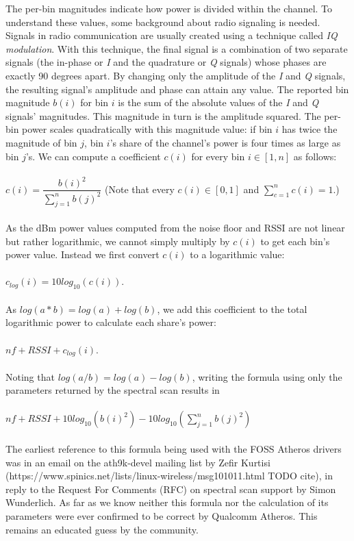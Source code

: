 \documentclass[a4paper, 11pt]{article}
\begin{document}
The per-bin magnitudes indicate how power is divided within the channel. To understand these values, some background about radio signaling is needed. Signals in radio communication are usually created using a technique called \textit{IQ modulation}. With this technique, the final signal is a combination of two separate signals (the in-phase or \textit{I} and the quadrature or \textit{Q} signals) whose phases are exactly 90 degrees apart. By changing only the amplitude of the \textit{I} and \textit{Q} signals, the resulting signal's amplitude and phase can attain any value. The reported bin magnitude $b(i)$ for bin $i$ is the sum of the absolute values of the \textit{I} and \textit{Q} signals' magnitudes. This magnitude in turn is the amplitude squared. The per-bin power scales quadratically with this magnitude value: if bin $i$ has twice the magnitude of bin $j$, bin $i$'s share of the channel's power is four times as large as bin $j$'s. We can compute a coefficient $c(i)$ for every bin $i \in [1,n]$ as follows:\\\\\hspace*{1.5em}$c(i) = \dfrac{b(i)^2}{\sum\limits_{j=1}^{n}b(j)^2}$ (Note that every $c(i) \in [0,1]$ and $\sum\limits_{c=1}^{n}{c(i)} = 1$.) \\\\
As the dBm power values computed from the noise floor and RSSI are not linear but rather logarithmic, we cannot simply multiply by $c(i)$ to get each bin's power value. Instead we first convert $c(i)$ to a logarithmic value: \\ \\ $c_{log}(i) = 10 log_{10}(c(i))$. \\ \\ As $log(a*b) = log(a) + log(b)$, we add this coefficient to the total logarithmic power to calculate each share's power:\\ \\ $nf + RSSI + c_{log}(i)$.\\ \\ Noting that $log(a/b) = log(a) - log(b)$, writing the formula using only the parameters returned by the spectral scan results in\\ \\ $nf + RSSI  + 10 log_{10}(b(i)^2) - 10 log_{10}(\sum\limits_{j=1}^{n}{b(j)^2})$ \\ \\
The earliest reference to this formula being used with the FOSS Atheros drivers was in an email on the ath9k-devel mailing list by Zefir Kurtisi (https://www.spinics.net/lists/linux-wireless/msg101011.html TODO cite), in reply to the Request For Comments (RFC) on spectral scan support by Simon Wunderlich. As far as we know neither this formula nor the calculation of its parameters were ever confirmed to be correct by Qualcomm Atheros. This remains an educated guess by the community.
\end{document}
